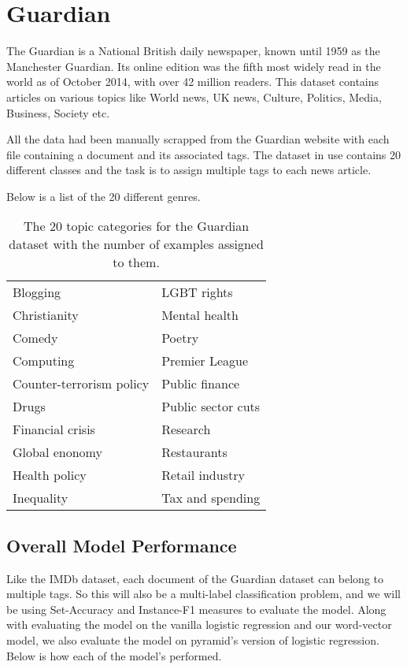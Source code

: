 \newpage
\section{Guardian}

The Guardian is a National British daily newspaper, known until 1959 as the Manchester Guardian. Its online edition was the fifth most widely read in the world as of October 2014, with over 42 million readers. This dataset contains articles on various topics like World news, UK news, Culture, Politics, Media, Business, Society etc.

All the data had been manually scrapped from the Guardian website with each file containing a document and its associated tags. The dataset in use contains 20 different classes and the task is to assign multiple tags to each news article.

Below is a list of the 20 different genres.

\begin{table}[htbp]
\centering
\begin{tabular}{l|l}
Blogging       & LGBT rights    \\
Christianity      & Mental health \\
Comedy     & Poetry       \\
Computing    & Premier League \\
Counter-terrorism policy      & Public finance   \\
Drugs      & Public sector cuts     \\
Financial crisis      & Research   \\
Global enonomy   & Restaurants   \\
Health policy & Retail industry     \\
Inequality     & Tax and spending      
\end{tabular}
\caption{\label{tab:widgets}The 20 topic categories for the Guardian dataset with the number of examples assigned to them.}
\end{table}

\subsection{Overall Model Performance}

Like the IMDb dataset, each document of the Guardian dataset can belong to multiple tags. So this will also be a multi-label classification problem, and we will be using Set-Accuracy and Instance-F1 measures to evaluate the model. Along with evaluating the model on the vanilla logistic regression and our word-vector model, we also evaluate the model on pyramid's version of logistic regression. Below is how each of the model's performed.

